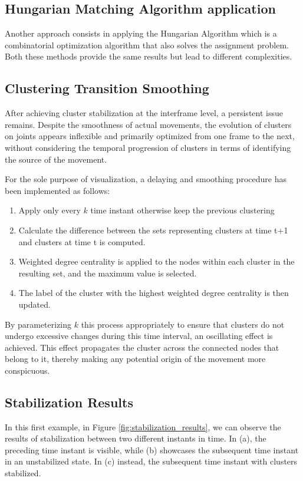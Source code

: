 \subsection{Hungarian Matching Algorithm application}
Another approach consists in applying the Hungarian Algorithm which is a combinatorial optimization algorithm that also solves the assignment problem.\\

Both these methods provide the same results but lead to different complexities.

\subsection{Clustering Transition Smoothing}

After achieving cluster stabilization at the interframe level, a persistent issue remains. 
Despite the smoothness of actual movements, the evolution of clusters on joints appears inflexible 
and primarily optimized from one frame to the next, 
without considering the temporal progression of clusters in terms of identifying the source of the movement.

For the sole purpose of visualization, a delaying and smoothing procedure has been implemented as follows:
\begin{enumerate}
  \item Apply only every $k$ time instant otherwise keep the previous clustering
  \item Calculate the difference between the sets representing clusters at time t+1 and clusters at time t is computed.
  \item Weighted degree centrality is applied to the nodes within each cluster in the resulting set, and the maximum value is selected.
  \item The label of the cluster with the highest weighted degree centrality is then updated.
\end{enumerate}

By parameterizing $k$ this process appropriately to ensure that clusters do not undergo excessive changes during this time interval, an oscillating effect is achieved. 
This effect propagates the cluster across the connected nodes that belong to it, thereby making any potential origin of the movement more conspicuous.

\subsection{Stabilization Results}
In this first example, in Figure \ref{fig:stabilization_results}, we can observe the results of stabilization between two different instants in time. 
In (a), the preceding time instant is visible, while (b) showcases the subsequent time instant in an unstabilized state. 
In (c) instead, the subsequent time instant with clusters stabilized.

